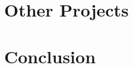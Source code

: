 \documentclass[draftthesis,fancy,edeposit]{uiuc_thesis_template}
\begin{document}
\part{Other Projects}

\part{Conclusion}

\clearpage
\backmatter
\printbibliography
\end{document}
